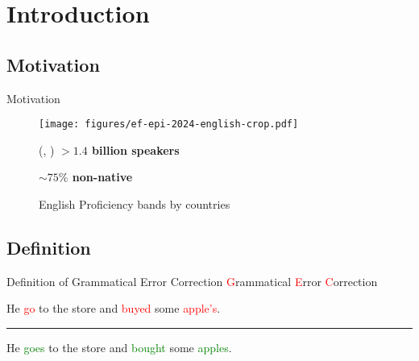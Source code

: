 \section{Introduction}

\subsection{Motivation}

\begin{frame}{Motivation}
  \begin{figure}
    \begin{center}
      \texttt{[image: figures/ef-epi-2024-english-crop.pdf]}
      \begin{textblock*}{8cm}(\paperwidth-9cm, \paperheight-2.5cm)  %
        \textbf{\Large $> 1.4$ billion speakers}

        \textbf{\Large $\sim 75\%$ non-native}
      \end{textblock*}
    \end{center}
    \caption{English Proficiency bands by countries \citeyear{ef-epi-2024}}\label{fig:ef-epi}
  \end{figure}
\end{frame}


\subsection{Definition}

\begin{frame}{Definition of Grammatical Error Correction}
  \centering
  {\Huge
    \textcolor{red}{G}rammatical
    \textcolor{red}{E}rror
    \textcolor{red}{C}orrection
  }

  \vfill

  {\Large
    He \textcolor{red}{go} to the store and \textcolor{red}{buyed} some \textcolor{red}{apple's}.
  }

  \noindent\rule[0.5ex]{\linewidth}{1pt}

  {\Large
    He \textcolor{green}{goes} to the store and \textcolor{green}{bought} some \textcolor{green}{apples}.
  }

  \vfill
\end{frame}


